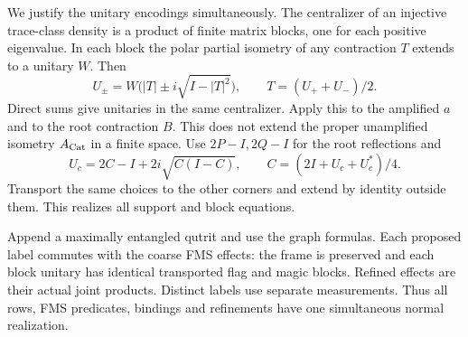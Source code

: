 We justify the unitary encodings simultaneously. The centralizer of an injective trace-class density is a product of finite matrix blocks, one for each positive eigenvalue. In each block the polar partial isometry of any contraction $T$ extends to a unitary $W$. Then
\[
 U_\pm=W\bigl(|T|\pm i\sqrt{I-|T|^2}\bigr),\qquad T=(U_++U_-)/2.
\]
Direct sums give unitaries in the same centralizer. Apply this to the amplified $a$ and to the root contraction $B$. This does not extend the proper unamplified isometry $A_{\rm Cat}$ in a finite space. Use $2P-I,2Q-I$ for the root reflections and
\[
 U_c=2C-I+2i\sqrt{C(I-C)},\qquad C=(2I+U_c+U_c^*)/4.
\]
Transport the same choices to the other corners and extend by identity outside them. This realizes all support and block equations.

Append a maximally entangled qutrit and use the graph formulas. Each proposed label commutes with the coarse FMS effects: the frame is preserved and each block unitary has identical transported flag and magic blocks. Refined effects are their actual joint products. Distinct labels use separate measurements. Thus all rows, FMS predicates, bindings and refinements have one simultaneous normal realization.
